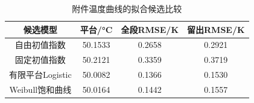 \begin{table}[htbp]
  \centering
  \caption{附件温度曲线的拟合候选比较}
  \label{tab:ambient-models}
  \begin{tabular}{cccc}
    \toprule
    候选模型 & 平台/°C & 全段RMSE/K & 留出RMSE/K \\
    \midrule
    自由初值指数 & 50.1533 & 0.2658 & 0.2921 \\
    固定初值指数 & 50.2121 & 0.3359 & 0.3719 \\
    有限平台Logistic & 50.0082 & 0.1366 & 0.1530 \\
    Weibull饱和曲线 & 50.0164 & 0.1442 & 0.1557 \\
    \bottomrule
  \end{tabular}
\end{table}
